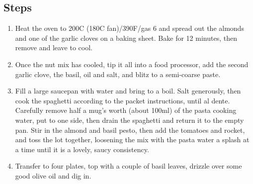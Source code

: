 \documentclass{book}
\begin{document}
\subsection*{Steps}
\begin{enumerate}
\item Heat the oven to 200C (180C fan)/390F/gas 6 and spread out the almonds and one of the garlic cloves on a baking sheet. Bake for 12 minutes, then remove and leave to cool.
\item Once the nut mix has cooled, tip it all into a food processor, add the second garlic clove, the basil, oil and salt, and blitz to a semi-coarse paste.
\item Fill a large saucepan with water and bring to a boil. Salt generously, then cook the spaghetti according to the packet instructions, until al dente. Carefully remove half a mug’s worth (about 100ml) of the pasta cooking water, put to one side, then drain the spaghetti and return it to the empty pan. Stir in the almond and basil pesto, then add the tomatoes and rocket, and toss the lot together, loosening the mix with the pasta water a splash at a time until it is a lovely, saucy consistency.
\item Transfer to four plates, top with a couple of basil leaves, drizzle over some good olive oil and dig in.
\end{enumerate}
\newpage
\end{document}
